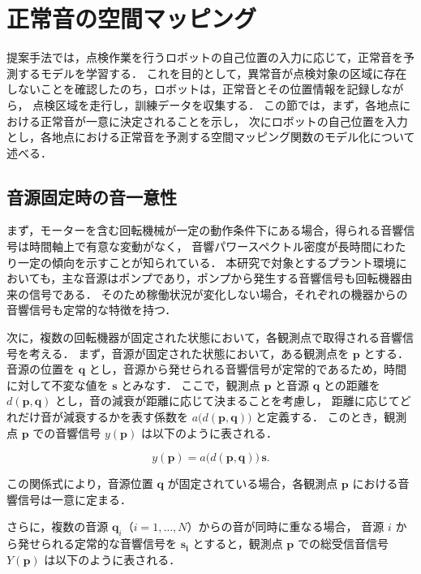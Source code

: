 \documentclass[../main]{subfiles}
\begin{document}
\section{正常音の空間マッピング}
\label{sec:pmethod_mapping}

提案手法では，点検作業を行うロボットの自己位置の入力に応じて，正常音を予測するモデルを学習する．
これを目的として，異常音が点検対象の区域に存在しないことを確認したのち，ロボットは，正常音とその位置情報を記録しながら，
点検区域を走行し，訓練データを収集する．
この節では，まず，各地点における正常音が一意に決定されることを示し，
次にロボットの自己位置を入力とし，各地点における正常音を予測する空間マッピング関数のモデル化について述べる．
\subsection{音源固定時の音一意性}


まず，モーターを含む回転機械が一定の動作条件下にある場合，得られる音響信号は時間軸上で有意な変動がなく，
音響パワースペクトル密度が長時間にわたり一定の傾向を示すことが知られている\cite{beranek1992noise}．
本研究で対象とするプラント環境においても，主な音源はポンプであり，ポンプから発生する音響信号も回転機器由来の信号である．
そのため稼働状況が変化しない場合，それぞれの機器からの音響信号も定常的な特徴を持つ．

次に，複数の回転機器が固定された状態において，各観測点で取得される音響信号を考える．
まず，音源が固定された状態において，ある観測点を \(\mathbf{p}\) とする．
音源の位置を \(\mathbf{q}\) とし，音源から発せられる音響信号が定常的であるため，時間に対して不変な値を \(\mathbf{s}\) とみなす．
ここで，観測点 \(\mathbf{p}\) と音源 \(\mathbf{q}\) との距離を \(d(\mathbf{p}, \mathbf{q})\) とし，音の減衰が距離に応じて決まることを考慮し，
距離に応じてどれだけ音が減衰するかを表す係数を \(a\bigl(d(\mathbf{p}, \mathbf{q})\bigr)\) と定義する．
このとき，観測点 \(\mathbf{p}\) での音響信号 \(y(\mathbf{p})\) は以下のように表される．

\begin{equation}
  y(\mathbf{p}) = a\bigl(d(\mathbf{p}, \mathbf{q})\bigr) \, \mathbf{s}.
\end{equation}

この関係式により，音源位置 \(\mathbf{q}\) が固定されている場合，各観測点 \(\mathbf{p}\) における音響信号は一意に定まる．

さらに，複数の音源 \(\mathbf{q}_i\)（\(i=1,\dots,N\)）からの音が同時に重なる場合，
音源 \(i\) から発せられる定常的な音響信号を \(\mathbf{s_i}\) とすると，観測点 \(\mathbf{p}\) での総受信音信号 \(Y(\mathbf{p})\) は以下のように表される．
\end{document}
